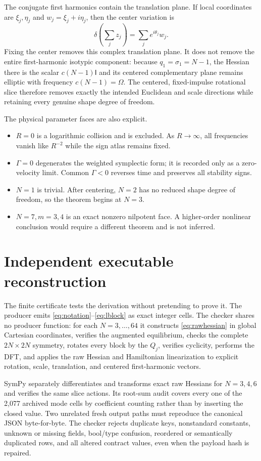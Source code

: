 \documentclass[10pt]{article}
\newcommand{\Id}{\mathsf I}
\begin{document}
The conjugate first harmonics contain the translation plane.  If local
coordinates are $\xi_j,\eta_j$ and $w_j=\xi_j+i\eta_j$, then the center
variation is
\[
 \delta\!\left(\sum_jz_j\right)=\sum_je^{i\theta_j}w_j.
\]
Fixing the center removes this complex translation plane.  It does not remove
the entire first-harmonic isotypic component: because
$q_1=\sigma_1=N-1$, the Hessian there is the scalar $c(N-1)\Id$ and its
centered complementary plane remains elliptic with frequency
$c(N-1)=\Omega$.  The centered, fixed-impulse rotational slice therefore
removes exactly the intended Euclidean and scale directions while retaining
every genuine shape degree of freedom.

The physical parameter faces are also explicit.
\begin{itemize}
\item $R=0$ is a logarithmic collision and is excluded.  As $R\to\infty$,
all frequencies vanish like $R^{-2}$ while the sign atlas remains fixed.
\item $\Gamma=0$ degenerates the weighted symplectic form; it is recorded only
as a zero-velocity limit.  Common $\Gamma<0$ reverses time and preserves all
stability signs.
\item $N=1$ is trivial.  After centering, $N=2$ has no reduced shape degree of
freedom, so the theorem begins at $N=3$.
\item $N=7,m=3,4$ is an exact nonzero nilpotent face.  A higher-order
nonlinear conclusion would require a different theorem and is not inferred.
\end{itemize}

\section{Independent executable reconstruction}

The finite certificate tests the derivation without pretending to prove it.
The producer emits \eqref{eq:notation}--\eqref{eq:lblock} as exact integer
cells.  The checker shares no producer function: for each $N=3,\ldots,64$ it
constructs \eqref{eq:rawhessian} in global Cartesian coordinates, verifies
the augmented equilibrium, checks the complete $2N\times2N$ symmetry, rotates
every block by the $Q_j$, verifies cyclicity, performs the DFT, and applies the
raw Hessian and Hamiltonian linearization to explicit rotation, scale,
translation, and centered first-harmonic vectors.

SymPy separately differentiates and transforms exact raw Hessians for
$N=3,4,6$ and verifies the same slice actions.  Its root-sum audit covers every
one of the 2,077 archived mode cells by coefficient counting rather than by
inserting the closed value.  Two unrelated fresh output paths must reproduce
the canonical JSON byte-for-byte.  The checker rejects duplicate keys,
nonstandard constants, unknown or missing fields, bool/type confusion,
reordered or semantically duplicated rows, and all altered contract values,
even when the payload hash is repaired.
\fi
\end{document}
